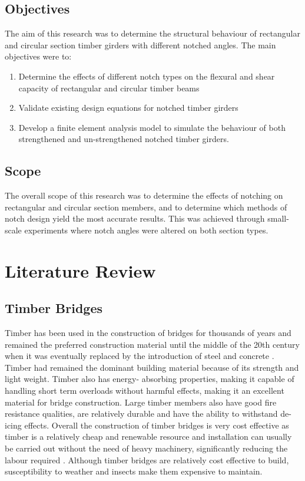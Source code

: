 \documentclass[11pt,a4paper]{article}
\numberwithin{equation}{subsection}
\begin{document}
	
	\subsection{Objectives}
	The aim of this research was to determine the structural behaviour of rectangular and circular section timber girders with different notched angles. The main objectives were to:\par 
	
	\begin{enumerate}
		\item Determine the effects of different notch types on the flexural and shear capacity of rectangular and circular timber beams
		\item Validate existing design equations for notched timber girders
		\item Develop a finite element analysis model to simulate the behaviour of both strengthened and un-strengthened notched timber girders.
	\end{enumerate}
	
	\subsection{Scope}
	\noindent
	The overall scope of this research was to determine the effects of notching on rectangular and circular section members, and to determine which methods of notch design yield the most accurate results. This was achieved through small-scale experiments where notch angles were altered on both section types. 
	
	\pagebreak
	
	\section{Literature Review}
	
	\subsection{Timber Bridges}
	Timber has been used in the construction of bridges for thousands of years \cite{ritter_timber_1990} and remained the preferred construction material until the middle of the 20th century when it was eventually replaced by the introduction of steel and concrete \cite{ritter_timber_1990,_timber_2005} . Timber had remained the dominant building material because of its strength and light weight. Timber also has energy- absorbing properties, making it capable of handling short term overloads without harmful effects, making it an excellent material for bridge construction. Large timber members also have good fire resistance qualities, are relatively durable and have the ability to withstand de-icing effects. Overall the construction of timber bridges is very cost effective as timber is a relatively cheap and renewable resource and installation can usually be carried out without the need of heavy machinery, significantly reducing the labour required \cite{ritter_timber_1990}. Although timber bridges are relatively cost effective to build, susceptibility to weather and insects make them expensive to maintain.
	
\end{document}
